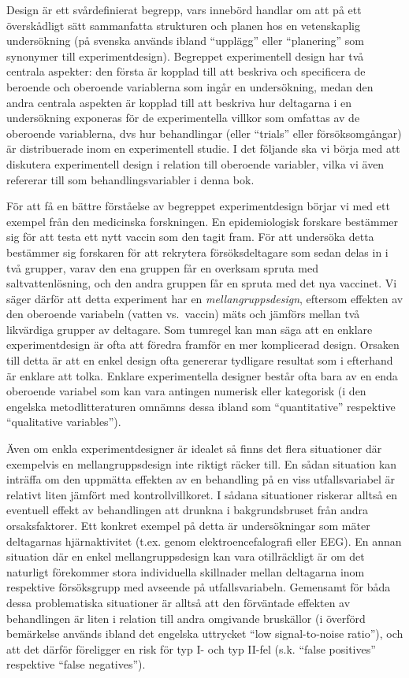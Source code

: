 \documentclass[
]{book}
\begin{document}
Design är ett svårdefinierat begrepp, vars innebörd handlar om att på ett överskådligt sätt sammanfatta strukturen och planen hos en vetenskaplig undersökning (på svenska används ibland ``upplägg'' eller ``planering'' som synonymer till experimentdesign). Begreppet experimentell design har två centrala aspekter: den första är kopplad till att beskriva och specificera de beroende och oberoende variablerna som ingår en undersökning, medan den andra centrala aspekten är kopplad till att beskriva hur deltagarna i en undersökning exponeras för de experimentella villkor som omfattas av de oberoende variablerna, dvs hur behandlingar (eller ``trials'' eller försöksomgångar) är distribuerade inom en experimentell studie. I det följande ska vi börja med att diskutera experimentell design i relation till oberoende variabler, vilka vi även refererar till som behandlingsvariabler i denna bok.

För att få en bättre förståelse av begreppet experimentdesign börjar vi med ett exempel från den medicinska forskningen. En epidemiologisk forskare bestämmer sig för att testa ett nytt vaccin som den tagit fram. För att undersöka detta bestämmer sig forskaren för att rekrytera försöksdeltagare som sedan delas in i två grupper, varav den ena gruppen får en overksam spruta med saltvattenlösning, och den andra gruppen får en spruta med det nya vaccinet. Vi säger därför att detta experiment har en \emph{mellangruppsdesign}, eftersom effekten av den oberoende variabeln (vatten vs.~vaccin) mäts och jämförs mellan två likvärdiga grupper av deltagare. Som tumregel kan man säga att en enklare experimentdesign är ofta att föredra framför en mer komplicerad design. Orsaken till detta är att en enkel design ofta genererar tydligare resultat som i efterhand är enklare att tolka. Enklare experimentella designer består ofta bara av en enda oberoende variabel som kan vara antingen numerisk eller kategorisk (i den engelska metodlitteraturen omnämns dessa ibland som ``quantitative'' respektive ``qualitative variables'').

Även om enkla experimentdesigner är idealet så finns det flera situationer där exempelvis en mellangruppsdesign inte riktigt räcker till. En sådan situation kan inträffa om den uppmätta effekten av en behandling på en viss utfallsvariabel är relativt liten jämfört med kontrollvillkoret. I sådana situationer riskerar alltså en eventuell effekt av behandlingen att drunkna i bakgrundsbruset från andra orsaksfaktorer. Ett konkret exempel på detta är undersökningar som mäter deltagarnas hjärnaktivitet (t.ex. genom elektroencefalografi eller EEG). En annan situation där en enkel mellangruppsdesign kan vara otillräckligt är om det naturligt förekommer stora individuella skillnader mellan deltagarna inom respektive försöksgrupp med avseende på utfallsvariabeln. Gemensamt för båda dessa problematiska situationer är alltså att den förväntade effekten av behandlingen är liten i relation till andra omgivande bruskällor (i överförd bemärkelse används ibland det engelska uttrycket ``low signal-to-noise ratio''), och att det därför föreligger en risk för typ I- och typ II-fel (s.k. ``false positives'' respektive ``false negatives'').
\end{document}
